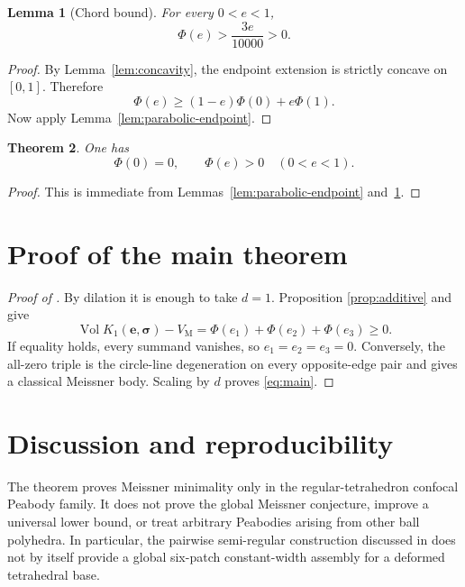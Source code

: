\documentclass[11pt]{article}
\numberwithin{equation}{section}
\newtheorem{theorem}{Theorem}[section]
\newtheorem{lemma}[theorem]{Lemma}
\theoremstyle{remark}
\newcommand{\Vol}{\operatorname{Vol}}
\newcommand{\VM}{V_{\mathrm M}}
\begin{document}
\begin{lemma}[Chord bound]
\label{lem:chord}
For every \(0<e<1\),
\begin{equation}
  \Phi(e)>\frac{3e}{10000}>0.
  \label{eq:chord-bound}
\end{equation}
\end{lemma}

\begin{proof}
By Lemma~\ref{lem:concavity}, the endpoint extension is strictly concave on \([0,1]\). Therefore
\[
  \Phi(e)\ge(1-e)\Phi(0)+e\Phi(1).
\]
Now apply Lemma~\ref{lem:parabolic-endpoint}.
\end{proof}

\begin{theorem}
\label{thm:phi}
One has
\begin{equation}
  \Phi(0)=0,
  \qquad
  \Phi(e)>0\quad(0<e<1).
  \label{eq:phi-positive}
\end{equation}
\end{theorem}

\begin{proof}
This is immediate from Lemmas~\ref{lem:parabolic-endpoint} and~\ref{lem:chord}.
\end{proof}

\section{Proof of the main theorem}

\begin{proof}[Proof of ]
By dilation it is enough to take \(d=1\). Proposition \ref{prop:additive} and  give
\[
  \Vol K_1(\mathbf e,\boldsymbol\sigma)-\VM
  =\Phi(e_1)+\Phi(e_2)+\Phi(e_3)\ge0.
\]
If equality holds, every summand vanishes, so \(e_1=e_2=e_3=0\). Conversely, the all-zero triple is the circle-line degeneration on every opposite-edge pair and gives a classical Meissner body. Scaling by \(d\) proves \eqref{eq:main}.
\end{proof}

\section{Discussion and reproducibility}

The theorem proves Meissner minimality only in the regular-tetrahedron confocal Peabody family. It does not prove the global Meissner conjecture, improve a universal lower bound, or treat arbitrary Peabodies arising from other ball polyhedra. In particular, the pairwise semi-regular construction discussed in \cite{ArelioMontejanoOliveros2023} does not by itself provide a global six-patch constant-width assembly for a deformed tetrahedral base.
\end{document}
